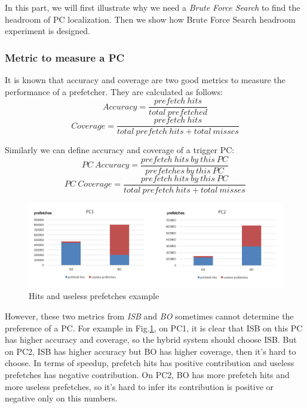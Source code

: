   In this part, we will first illustrate why we need a \emph{Brute Force Search} to find the headroom of PC localization. Then we show how Brute Force Search headroom experiment is designed. \par

  \subsubsection{Metric to measure a PC}
  \label{sec:metricPC}

  It is known that accuracy and coverage are two good metrics \cite{yalepaper} to measure the performance of a prefetcher. They are calculated as follows:
  \begin{equation}
  Accuracy = \frac{prefetch\ hits}{total\  prefetched}
  \end{equation}
  \begin{equation}
  Coverage = \frac{prefetch\ hits}{total\ prefetch\ hits + total\ misses}
  \end{equation}

  Similarly we can define accuracy and coverage of a trigger PC:
  \begin{equation}
  PC\ Accuracy = \frac{prefetch\ hits\ by\ this\ PC}{prefetches\ by\ this\ PC}
  \end{equation}
  \begin{equation}
  PC\ Coverage = \frac{prefetch\ hits\ by\ this\ PC}{total\ prefetch\ hits + total\ misses}
 \end{equation}

 \begin{figure}[ht!]
	\centering
	\includegraphics[width=1.0\textwidth]{images/metric.png}
	\caption{Hits and useless prefetches example}
	\label{fig:pcmetric}
\end{figure}

However, these two metrics from \emph{ISB} and \emph{BO} sometimes cannot determine the preference of a PC.
For example in Fig.\ref{fig:pcmetric}, on PC1, it is clear that ISB on this PC has higher accuracy and coverage, so the hybrid system should choose ISB. But on PC2, ISB has higher accuracy but BO has higher coverage, then it's hard to choose.
In terms of speedup, prefetch hits has positive contribution and useless prefetches has negative contribution.
On PC2, BO has more prefetch hits and more useless prefetches, so it's hard to infer its contribution is positive or negative only on this numbers.

